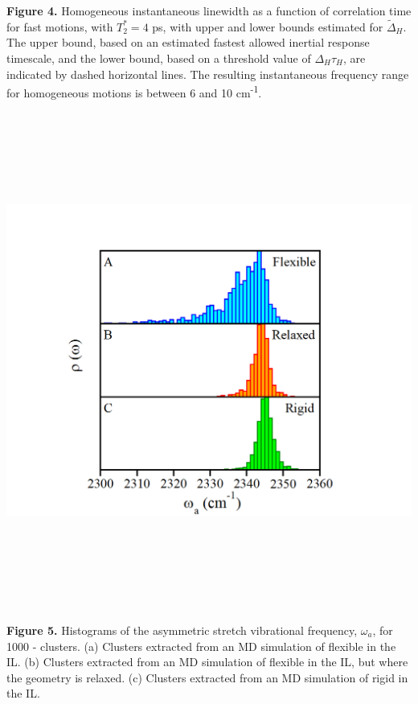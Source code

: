\documentclass[]{article}
\begin{document}
\textbf{Figure 4.} Homogeneous instantaneous linewidth as a function of correlation time for fast motions, with \(T_{2}^{*} = 4\) ps, with upper and lower bounds estimated for \({\widetilde{\Delta}}_{H}\). The upper bound, based on an estimated fastest allowed inertial response timescale, and the lower bound, based on a threshold value of \(\Delta_{H}\tau_{H}\), are indicated by dashed horizontal lines. The resulting instantaneous frequency range for homogeneous motions is between 6 and 10 cm\textsuperscript{-1}.

\includegraphics[width=6.43125in,height=6.41597in]{figure5.png}

\textbf{Figure 5.} Histograms of the  asymmetric stretch vibrational frequency, \(\omega_{a}\), for 1000 -\ce{[C4C1im][PF6]} clusters. (a) Clusters extracted from an MD simulation of flexible  in the \ce{[C4C1im][PF6]} IL. (b) Clusters extracted from an MD simulation of flexible  in the \ce{[C4C1im][PF6]} IL, but where the  geometry is relaxed. (c) Clusters extracted from an MD simulation of rigid  in the \ce{[C4C1im][PF6]} IL.
\end{document}
